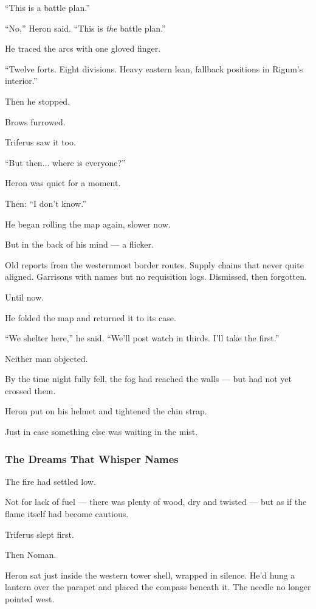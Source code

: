 \documentclass[12pt]{article}
\begin{document}
“This is a battle plan.”

“No,” Heron said. “This is \textit{the} battle plan.”

He traced the arcs with one gloved finger.

“Twelve forts. Eight divisions. Heavy eastern lean, fallback positions in Rigum’s interior.”

Then he stopped.

Brows furrowed.

Triferus saw it too.

“But then... where is everyone?”

Heron was quiet for a moment.

Then: “I don’t know.”

He began rolling the map again, slower now.

But in the back of his mind — a flicker.

Old reports from the westernmost border routes. Supply chains that never quite aligned. Garrisons with names but no requisition logs. Dismissed, then forgotten.

Until now.

He folded the map and returned it to its case.

“We shelter here,” he said. “We’ll post watch in thirds. I’ll take the first.”

Neither man objected.

By the time night fully fell, the fog had reached the walls — but had not yet crossed them.

Heron put on his helmet and tightened the chin strap.

Just in case something else was waiting in the mist.

\dotfill

\subsubsection*{The Dreams That Whisper Names}

The fire had settled low.

Not for lack of fuel — there was plenty of wood, dry and twisted — but as if the flame itself had become cautious.

Triferus slept first.

Then Noman.

Heron sat just inside the western tower shell, wrapped in silence. He’d hung a lantern over the parapet and placed the compass beneath it. The needle no longer pointed west.
\end{document}
